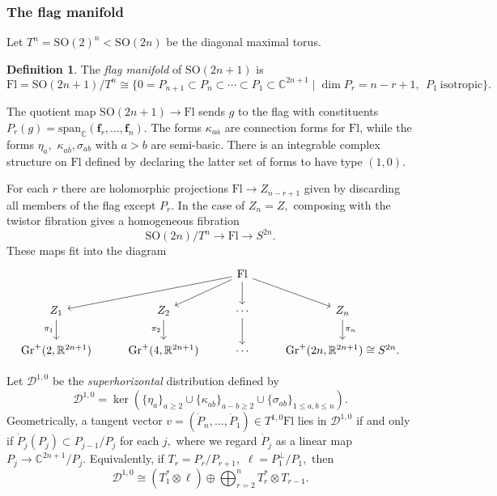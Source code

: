 \documentclass[11pt]{article}
\theoremstyle{definition}
\newtheorem{definition}[theorem]{Definition}
\newcommand{\R}{\mathbb{R}}
\newcommand{\C}{\mathbb{C}}
\newcommand{\SO}{\mathrm{SO}}
\numberwithin{equation}{section}
\begin{document}
\subsubsection{The flag manifold}

\indent \indent Let $T^n = \SO(2)^n < \SO(2n)$ be the diagonal maximal torus.

\begin{definition}
	The \emph{flag manifold} of $\SO(2n+1)$ is
	\begin{equation*}
		\mathrm{Fl} = \SO(2n+1)/T^n \cong \lbrace 0 = P_{n+1} \subset P_n \subset \cdots \subset P_1 \subset \C^{2n+1} \mid \dim P_r = n-r+1, \:\: P_1 \: \text{isotropic} \rbrace.
	\end{equation*}
\end{definition}
The quotient map $\SO(2n+1) \to \mathrm{Fl}$ sends $g$ to the flag with constituents $P_r(g) = \mathrm{span}_\C(\mathbf{f}_r, \ldots, \mathbf{f}_n).$ The forms $\kappa_{a \overline{a}}$ are connection forms for $\mathrm{Fl}$, while the forms $\eta_a,$ $\kappa_{a \overline{b}}, \sigma_{ab}$ with $a > b$ are semi-basic. There is an integrable complex structure on $\mathrm{Fl}$ defined by declaring the latter set of forms to have type $(1,0).$

For each $r$ there are holomorphic projections $\mathrm{Fl} \to Z_{n-r+1}$ given by discarding all members of the flag except $P_r.$ In the case of $Z_n = Z,$ composing with the twistor fibration gives a homogeneous fibration
\begin{equation*}
	\SO(2n)/T^n \to \mathrm{Fl} \to S^{2n}.
\end{equation*}
These maps fit into the diagram
\[\begin{tikzcd}
	&& {\mathrm{Fl}} & \\
	{Z_1} & {Z_2} & \cdots & {Z_n} \\
	{\mathrm{Gr}^+(2,\R^{2n+1})} & {\mathrm{Gr}^+(4,\R^{2n+1})} & \cdots & {\mathrm{Gr}^+(2n,\R^{2n+1}) \cong S^{2n}.}
	\arrow[from=1-3, to=2-1]
	\arrow[from=1-3, to=2-2]
	\arrow[from=1-3, to=2-3]
	\arrow[from=1-3, to=2-4]
	\arrow["{\pi_1}"', from=2-1, to=3-1]
	\arrow["{\pi_2}"', from=2-2, to=3-2]
	\arrow[from=2-3, to=3-3]
	\arrow["{\pi_n}", from=2-4, to=3-4]
\end{tikzcd}\]

Let $\mathcal{D}^{1,0}$ be the \emph{superhorizontal} distribution \cite{BursRawn90} defined by
\begin{equation}\label{eq:flagdistribution}
	\mathcal{D}^{1,0} = \ker\left( \lbrace \eta_a \rbrace_{a \geq 2} \cup \lbrace \kappa_{a \overline{b}} \rbrace_{a-b \geq 2} \cup \lbrace \sigma_{ab} \rbrace_{1 \leq a,b \leq n} \right).
\end{equation}
Geometrically, a tangent vector $v = (\dot{P}_n, \ldots, \dot{P}_1) \in T^{1,0} \mathrm{Fl}$ lies in $\mathcal{D}^{1,0}$ if and only if $\dot{P}_j(P_j) \subset P_{j-1}/P_j$ for each $j,$ where we regard $\dot{P}_j$ as a linear map $P_j \to \C^{2n+1}/P_j.$ Equivalently, if $T_r = P_{r} / P_{r+1},$ $\ell = P_1^\perp / P_1,$ then
\begin{equation}\label{eq:superhorizontal}
	\mathcal{D}^{1,0} \cong \left( T_1^* \otimes \ell \right) \oplus \bigoplus_{r=2}^{n} T_r^* \otimes T_{r-1}.
\end{equation}
\end{document}
